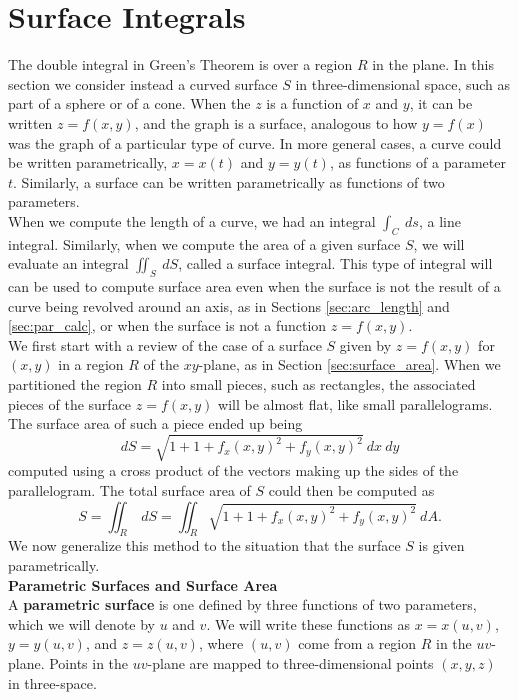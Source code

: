 \section{Surface Integrals}\label{sec:greens_theorem}

The double integral in Green's Theorem is over a region $R$ in the plane.  In this section we consider instead a curved surface $S$ in three-dimensional space, such as part of a sphere or of a cone. When the $z$ is a function of $x$ and $y$, it can be written $z = f(x,y)$, and the graph is a surface, analogous to how $y = f(x)$ was the graph of a particular type of curve.  In more general cases, a curve could be written parametrically, $x = x(t)$ and $y = y(t)$, as functions of a parameter $t$.  Similarly, a surface can be written parametrically as functions of two parameters.\\

When we compute the length of a curve, we had an integral $\int_C \: ds$, a line integral.  Similarly, when we compute the area of a given surface $S$, we will evaluate an integral $\iint_S \: dS$, called a surface integral. This type of integral will can be used to compute surface area even when the surface is not the result of a curve being revolved around an axis, as in Sections \ref{sec:arc_length} and \ref{sec:par_calc}, or when the surface is not a function $z = f(x,y)$. \\

We first start with a review of the case of a surface $S$ given by $z = f(x,y)$ for $(x,y)$ in a region $R$ of the $xy$-plane, as in Section \ref{sec:surface_area}.  When we partitioned the region $R$ into small pieces, such as rectangles, the associated pieces of the surface $z = f(x,y)$ will be almost flat, like small parallelograms. The surface area of such a piece ended up being
$$dS = \sqrt{1 + 1+f_x(x,y)^2+f_y(x,y)^2} \: dx \: dy$$
computed using a cross product of the vectors making up the sides of the parallelogram. The total surface area of $S$ could then be computed as
$$S = \iint_R \: dS = \iint_R \sqrt{1 + 1+f_x(x,y)^2+f_y(x,y)^2} \: dA.$$
We now generalize this method to the situation that the surface $S$ is given parametrically.\\

\noindent\textbf{\large Parametric Surfaces and Surface Area}\\

A \textbf{parametric surface} is one defined by three functions of two parameters, which we will denote by $u$ and $v$.  We will write these functions as $x = x(u,v)$, $y = y(u,v)$, and $z = z(u,v)$, where $(u,v)$ come from a region $R$ in the $uv$-plane.  Points in the $uv$-plane are mapped to three-dimensional points $(x,y,z)$ in three-space.\\

